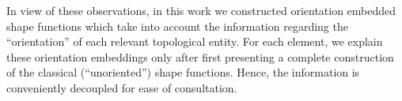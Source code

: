 In view of these observations, in this work we constructed orientation embedded shape functions which take into account the information regarding the ``orientation'' of each relevant topological entity.
For each element, we explain these orientation embeddings only after first presenting a complete construction of the classical (``unoriented'') shape functions.
Hence, the information is conveniently decoupled for ease of consultation.

